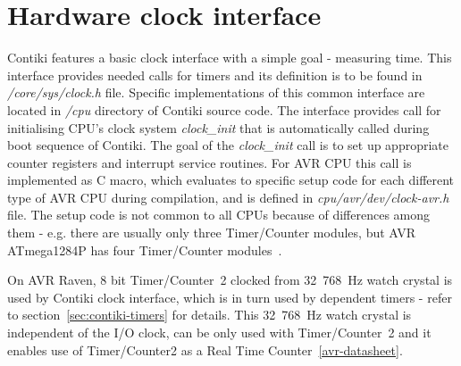 
\section{Hardware clock interface}
Contiki features a basic clock interface with a simple goal - measuring time.
This interface provides needed calls for timers and its definition is to be found in {\it{/core/sys/clock.h}} file.
Specific implementations of this common interface are located in {\it{/cpu}} directory of Contiki source code.
The interface provides call for initialising CPU's clock system {\it{clock\_init}} that is automatically called during
boot sequence of Contiki.
The goal of the {\it{clock\_init}} call is to set up
appropriate counter registers and interrupt service routines. %
For AVR CPU this call is implemented as C macro, which evaluates to specific setup code for each
different type of AVR CPU during compilation, and is defined in {\it{cpu/avr/dev/clock-avr.h}} file.
The setup code is not common to all CPUs because of differences among them - e.g. there are usually
only three Timer/Counter modules, but AVR ATmega1284P has four Timer/Counter modules~\cite{avr-datasheet}.

On AVR Raven, 8 bit Timer/Counter~2 clocked from 32~768~Hz watch crystal
is used by Contiki clock interface,
which is in turn used by dependent timers - refer to section~\ref{sec:contiki-timers} for details.
This 32~768~Hz watch crystal is independent of the I/O clock, can be only used
with Timer/Counter~2 and it
enables use of Timer/Counter2 as a Real Time Counter~\ref{avr-datasheet}.


